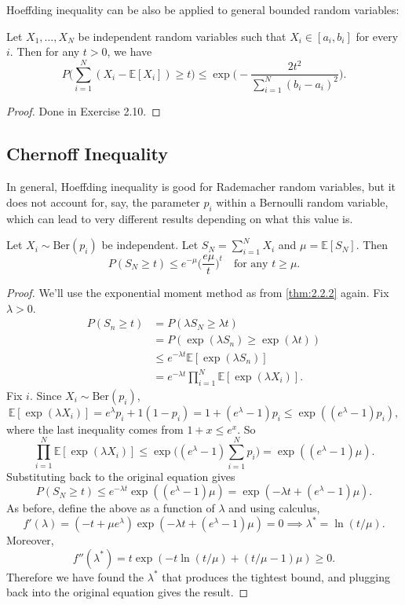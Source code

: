 Hoeffding inequality can be also be applied to general bounded random variables: 
\begin{theorem}
Let $X_1, \dots, X_N$ be independent random variables such that $X_i \in [a_i, b_i]$ for every $i$. Then 
for any $t > 0$, we have 
\[ P \biggl( \sum_{i = 1}^{N} (X_i - \mathbb{E}[X_i]) \geq t \biggr) 
\leq \exp{\biggl( -\frac{2t^2}{\sum_{i = 1}^{N} (b_i - a_i)^2} \biggr)}. \]
\end{theorem}

\begin{proof}
Done in Exercise 2.10.
\end{proof}


\subsection{Chernoff Inequality}
In general, Hoeffding inequality is good for Rademacher random variables, but it does not account for, say, 
the parameter $p_i$ within a Bernoulli random variable, which can lead to very different results depending 
on what this value is.

\begin{theorem}
\label{thm:2.3.1}
Let $X_i \sim \text{Ber}(p_i)$ be independent. Let $S_N = \sum_{i = 1}^{N} X_i$ and $\mu = \mathbb{E}[S_N]$. 
Then 
\[ P(S_N \geq t) \leq e^{-\mu} \biggl( \frac{e \mu}{t} \biggr)^t \quad \text{for any } t \geq \mu. \]
\end{theorem}

\begin{proof}
We'll use the exponential moment method as from \cref{thm:2.2.2} again. Fix $\lambda > 0$.
\begin{align*}
	P(S_n \geq t) 
	&= P(\lambda S_N \geq \lambda t) \\
	&= P(\exp{(\lambda S_n)} \geq \exp{(\lambda t)}) \\
	&\leq e^{-\lambda t} \mathbb{E}[\exp{(\lambda S_n)}] \\
	&= e^{-\lambda t} \prod_{i = 1}^{N} \mathbb{E}[\exp{(\lambda X_i)}]. 
\end{align*}
Fix $i$. Since $X_i \sim \text{Ber}(p_i)$, 
\[ \mathbb{E}[\exp{(\lambda X_i)}] = e^{\lambda} p_i + 1(1 - p_i) 
= 1 + (e^\lambda - 1)p_i \leq \exp{((e^\lambda - 1) p_i)}, \]
where the last inequality comes from $1 + x \leq e^x$. So 
\[ \prod_{i = 1}^{N} \mathbb{E}[\exp{(\lambda X_i)}] \leq \exp{ \biggl( 
(e^\lambda - 1) \sum_{i = 1}^{N} p_i \biggr)} = \exp{((e^\lambda - 1)\mu)}. \]
Substituting back to the original equation gives 
\[ P(S_N \geq t) \leq e^{-\lambda t} \exp{((e^\lambda - 1)\mu)} 
= \exp{(-\lambda t + (e^\lambda - 1)\mu)}. \]
As before, define the above as a function of $\lambda$ and using calculus, 
\[ f'(\lambda) = (-t + \mu e^\lambda)\exp{(-\lambda t + (e^\lambda - 1)\mu)} = 0 
\implies \lambda^* = \ln{(t / \mu)}. \]
Moreover, 
\[ f''(\lambda^*) = t\exp{(-t \ln{(t / \mu)} + (t / \mu - 1)\mu)} \geq 0. \]
Therefore we have found the $\lambda^*$ that produces the tightest bound, and plugging back into the 
original equation gives the result.
\end{proof}


